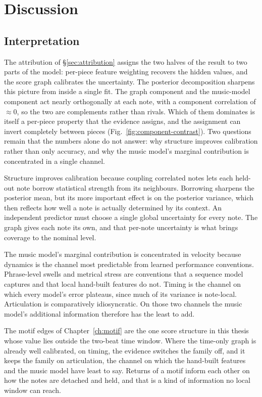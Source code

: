 \chapter{Discussion}\label{ch:discussion}

\section{Interpretation}
The attribution of \S\ref{sec:attribution} assigns the two halves of the
result to two parts of the model: per-piece feature weighting recovers the
hidden values, and the score graph calibrates the uncertainty. The posterior
decomposition sharpens this picture from inside a single fit. The graph
component and the music-model component act nearly orthogonally at each
note, with a component correlation of $\approx 0$, so the two are complements
rather than rivals. Which of them dominates is itself a per-piece property
that the evidence assigns, and the assignment can invert completely between
pieces (Fig.~\ref{fig:component-contrast}). Two questions remain that the
numbers alone do not answer: why structure improves calibration rather than
only accuracy, and why the music model's marginal contribution is
concentrated in a single channel.

Structure improves calibration because coupling correlated notes lets each
held-out note borrow statistical strength from its neighbours. Borrowing
sharpens the posterior mean, but its more important effect is on the
posterior variance, which then reflects how well a note is actually
determined by its context. An independent predictor must choose a single
global uncertainty for every note. The graph gives each note its own, and
that per-note uncertainty is what brings coverage to the nominal level.

The music model's marginal contribution is concentrated in velocity because
dynamics is the channel most predictable from learned performance
conventions. Phrase-level swells and metrical stress are conventions that a
sequence model captures and that local hand-built features do not. Timing is
the channel on which every model's error plateaus, since much of its
variance is note-local. Articulation is comparatively idiosyncratic. On
those two channels the music model's additional information therefore has
the least to add.

The motif edges of Chapter~\ref{ch:motif} are the one score structure in
this thesis whose value lies outside the two-beat time window. Where the
time-only graph is already well calibrated, on timing, the evidence
switches the family off, and it keeps the family on articulation, the
channel on which the hand-built features and the music model have least
to say. Returns of a motif inform each other on how the notes are
detached and held, and that is a kind of information no local window can
reach.

